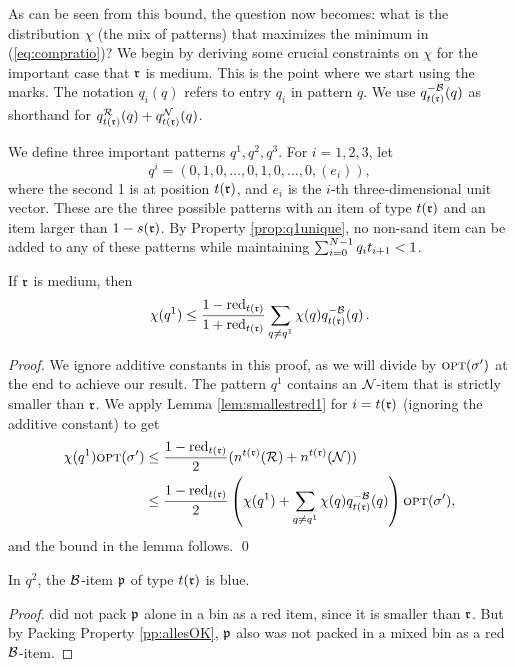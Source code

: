 As can be seen from this bound, the question now becomes: what is the distribution $\chi$ (the mix of patterns) that maximizes the minimum in (\ref{eq:compratio})? We begin by deriving some crucial constraints on $\chi$ for the important case that $\mathfrak{r}$ is medium.
This is the point where we start using the marks.
The notation $q_i(q)$ refers to entry $q_i$ in pattern $q$.
We use $q_{t(\mathfrak{r})}^{-\mathcal{B}}(q)$ as shorthand for $q_{t(\mathfrak{r})}^{\mathcal{R}}(q)+q_{t(\mathfrak{r})}^{\mathcal{N}}(q)$.

We define three important patterns $q^1,q^2,q^3$.
For $i=1,2,3$, let $$q^i = (0,1,0,\ldots,0,1,0,\ldots,0,(e_i)),$$ where the second 1 is at position $t(\mathfrak{r})$, and
$e_i$ is the $i$-th three-dimensional unit vector. 
These are the three possible patterns with an item of type $t(\mathfrak{r})$ and an item larger than $1-s(\mathfrak{r})$.
By Property \ref{prop:q1unique}, 
no non-sand item can be added to any of these patterns while maintaining $\sum_{i=0}^{N-1} q_it_{i+1}<1$.


\begin{lemma}
	\label{lem:q1fv}
	If {$\mathfrak{r}$ is medium},
	then \[\chi(q^1) \le \frac{1-\mathrm{red}_{t(\mathfrak{r})}}{1+\mathrm{red}_{t(\mathfrak{r})}}\sum_{q\neq q^1} \chi(q) q_{t(\mathfrak{r})}^{-\mathcal{B}}(q)\,.\]
\end{lemma}
\begin{proof}
	We ignore additive constants in this proof, as we will divide by 
	$\mbox{\textsc{opt}}(\sigma')$ at the end to achieve our result.	
	The pattern $q^1$ contains an $\mathcal{N}$-item that is strictly smaller than
	$\mathfrak{r}$. 
	We apply Lemma \ref{lem:smallestred1} for $i=t(\mathfrak{r})$ (ignoring the additive constant) to get
	\begin{align*}
	\chi(q^1)\mbox{\textsc{opt}}(\sigma') &\le \frac{1-\mathrm{red}_{t(\mathfrak{r})}}{2} (n^{t(\mathfrak{r})}(\mathcal{R}) + n^{t(\mathfrak{r})}(\mathcal{N}))	\\
	&
	\le \frac{1-\mathrm{red}_{t(\mathfrak{r})}}{2} \left(\chi(q^1) + \sum_{q\neq q^1} \chi(q)
	q_{t(\mathfrak{r})}^{-\mathcal{B}}(q)
\right)\mbox{\textsc{opt}}(\sigma'),
	\end{align*}
	and the bound in the lemma follows.
	\qed\end{proof}



\begin{lemma}
	\label{lem:itsblue}
	In $q^2$, the $\mathcal{B}$-item $\mathfrak{p}$ of type $t(\mathfrak{r})$ is blue.
\end{lemma}
\begin{proof}
	{\EHarm} did not pack $\mathfrak{p}$ alone in a bin as a red item, since it is smaller than $\mathfrak{r}$.
	But by Packing Property \ref{pp:allesOK}, $\mathfrak{p}$ also was not packed in a mixed bin as a red $\mathcal{B}$-item.
\end{proof}

